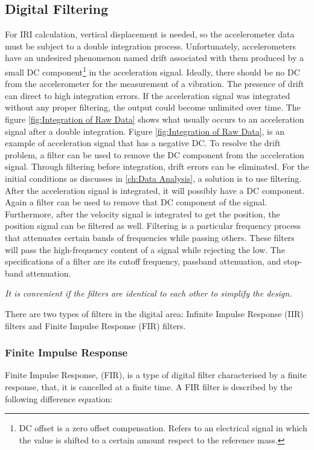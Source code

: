 \documentclass[tesi]{subfiles}
\begin{document}
\subsection{Digital Filtering} \label{ssc:Digital Filtering}
For IRI calculation, vertical displacement is needed, so the accelerometer data must be subject to a double integration process. 
Unfortunately, accelerometers have an undesired phenomenon named drift associated with them produced by a small DC component\footnote{DC offset is a zero offset compensation. Refers to an electrical signal in which the value is shifted to a certain amount respect to the reference mass.} in the acceleration signal.
Ideally, there should be no DC from the accelerometer for the measurement of a vibration. The presence of drift can direct to high integration errors. If the acceleration signal was integrated without any proper filtering, the output could become unlimited over time. The figure \ref{fig:Integration of Raw Data} shows what usually occurs to an acceleration signal after a double integration. Figure \ref{fig:Integration of Raw Data}, is an example of acceleration signal that has a negative DC.
To resolve the drift problem, a filter can be used to remove the DC component from the acceleration signal. Through filtering before integration, drift errors can be eliminated.
For the initial conditions as discusses in \ref{ch:Data Analysis}, a solution is to use filtering.  
After the acceleration signal is integrated, it will possibly have a DC component. Again a filter can be used to remove that DC component of the signal. Furthermore, after the velocity signal is integrated to get the position, the position signal can be filtered as well.
Filtering is a particular frequency process that attenuates certain bands of frequencies while passing others. These filters will pass the high-frequency content of a signal while rejecting the low. The specifications of a filter are its cutoff frequency, passband attenuation, and stop-band attenuation. 
\begin{center}\textit{It is convenient if the filters are identical to each other to simplify the design.}\end{center}


There are two types of filters in the digital area: Infinite Impulse Response (IIR) filters and Finite Impulse Response (FIR) filters. 

\subsubsection{Finite Impulse Response} \label{ssc:Finite Impulse Response}
Finite Impulse Response, (FIR), is a type of digital filter characterised by a finite response, that, it is cancelled at a finite time.
A FIR filter is described by the following difference equation:
\end{document}
